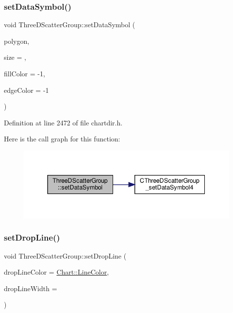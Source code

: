 \subsubsection{\texorpdfstring{set\+Data\+Symbol()}{setDataSymbol()}\hspace{0.1cm}{\footnotesize\ttfamily [4/4]}}
{\footnotesize\ttfamily void Three\+D\+Scatter\+Group\+::set\+Data\+Symbol (\begin{DoxyParamCaption}\item[{\hyperlink{class_int_array}{Int\+Array}}]{polygon,  }\item[{int}]{size = {},  }\item[{int}]{fill\+Color = {\ttfamily -\/1},  }\item[{int}]{edge\+Color = {\ttfamily -\/1} }\end{DoxyParamCaption})\hspace{0.3cm}{\ttfamily [inline]}}



Definition at line 2472 of file chartdir.\+h.

Here is the call graph for this function\+:
\nopagebreak
\begin{figure}[H]
\begin{center}
\leavevmode
\includegraphics[width=337pt]{class_three_d_scatter_group_a300cece2b98d9b32714dde52c96b58e1_cgraph}
\end{center}
\end{figure}
\mbox{\label{class_three_d_scatter_group_a2b595091d992d417f3ff9cca595edc28}} 
\subsubsection{\texorpdfstring{set\+Drop\+Line()}{setDropLine()}}
{\footnotesize\ttfamily void Three\+D\+Scatter\+Group\+::set\+Drop\+Line (\begin{DoxyParamCaption}\item[{int}]{drop\+Line\+Color = {\ttfamily \hyperlink{namespace_chart_abee0d882fdc9ad0b001245ad9fc64011a04817a359476e87a5c572a7a69cdaaec}{Chart\+::\+Line\+Color}},  }\item[{int}]{drop\+Line\+Width = {} }\end{DoxyParamCaption})\hspace{0.3cm}{\ttfamily [inline]}}



